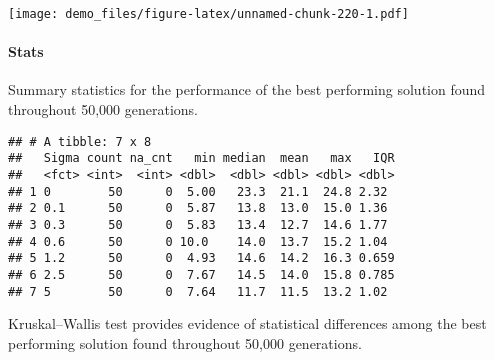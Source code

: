\documentclass[]{book}
\newenvironment{Shaded}{\begin{snugshade}}{\end{snugshade}}
\newcommand{\DataTypeTok}[1]{\textcolor[rgb]{0.13,0.29,0.53}{#1}}
\newcommand{\KeywordTok}[1]{\textcolor[rgb]{0.13,0.29,0.53}{\textbf{#1}}}
\newcommand{\NormalTok}[1]{#1}
\newcommand{\OperatorTok}[1]{\textcolor[rgb]{0.81,0.36,0.00}{\textbf{#1}}}
\newcommand{\OtherTok}[1]{\textcolor[rgb]{0.56,0.35,0.01}{#1}}
\newcommand{\StringTok}[1]{\textcolor[rgb]{0.31,0.60,0.02}{#1}}
\let\oldparagraph\paragraph
\renewcommand{\paragraph}[1]{\oldparagraph{#1}\mbox{}}
\begin{document}
\texttt{[image: demo\_files/figure-latex/unnamed-chunk-220-1.pdf]}

\hypertarget{stats-42}{%
\paragraph{Stats}\label{stats-42}}

Summary statistics for the performance of the best performing solution found throughout 50,000 generations.

\begin{Shaded}
\end{Shaded}

\begin{verbatim}
## # A tibble: 7 x 8
##   Sigma count na_cnt   min median  mean   max   IQR
##   <fct> <int>  <int> <dbl>  <dbl> <dbl> <dbl> <dbl>
## 1 0        50      0  5.00   23.3  21.1  24.8 2.32 
## 2 0.1      50      0  5.87   13.8  13.0  15.0 1.36 
## 3 0.3      50      0  5.83   13.4  12.7  14.6 1.77 
## 4 0.6      50      0 10.0    14.0  13.7  15.2 1.04 
## 5 1.2      50      0  4.93   14.6  14.2  16.3 0.659
## 6 2.5      50      0  7.67   14.5  14.0  15.8 0.785
## 7 5        50      0  7.64   11.7  11.5  13.2 1.02
\end{verbatim}

Kruskal--Wallis test provides evidence of statistical differences among the best performing solution found throughout 50,000 generations.
\end{document}
